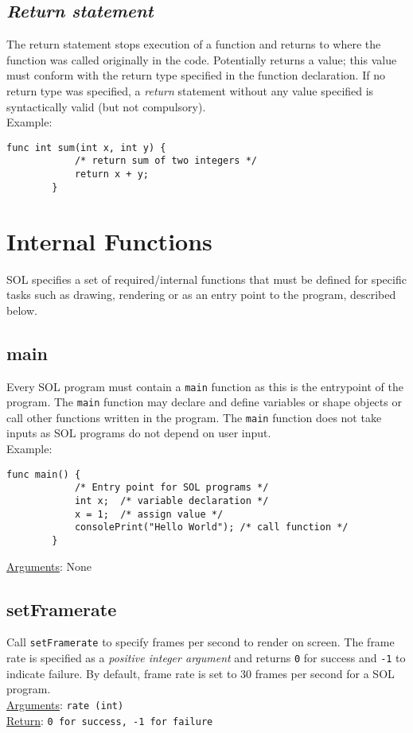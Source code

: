     \subsection{\textit{Return statement}}
    The return statement stops execution of a function and returns to where the function was called originally in the code. Potentially returns a value; this value must conform with the return type specified in the function declaration. If no return type was specified, a \textit{return} statement without any value specified is syntactically valid (but not compulsory).\\
    Example:\\
    \begin{lstlisting}[style=sol]
        func int sum(int x, int y) {
            /* return sum of two integers */
            return x + y;
        }
    \end{lstlisting}
    
\section{Internal Functions} \label{internal}
SOL specifies a set of required/internal functions that must be defined for specific tasks such as drawing, rendering or as an entry point to the program, described below.

    \subsection{main}
    Every SOL program must contain a \texttt{main} function as this is the entrypoint of the program. The \texttt{main} function may declare and define variables or shape objects or call other functions written in the program. The \texttt{main} function does not take inputs as SOL programs do not depend on user input.\\
    Example:\\
    \begin{lstlisting}[style=sol]
        func main() {
            /* Entry point for SOL programs */
            int x;  /* variable declaration */
            x = 1;  /* assign value */
            consolePrint("Hello World"); /* call function */
        }
    \end{lstlisting}
    \underline{Arguments}: None

    \subsection{setFramerate}
    Call \texttt{setFramerate} to specify frames per second to render on screen. The frame rate is specified as a \textit{positive integer argument} and returns \texttt{0} for success and \texttt{-1} to indicate failure. By default, frame rate is set to 30 frames per second for a SOL program.\\
    \underline{Arguments}: \texttt{rate (int)}\\
    \underline{Return}: \texttt{0 for success, -1 for failure}

